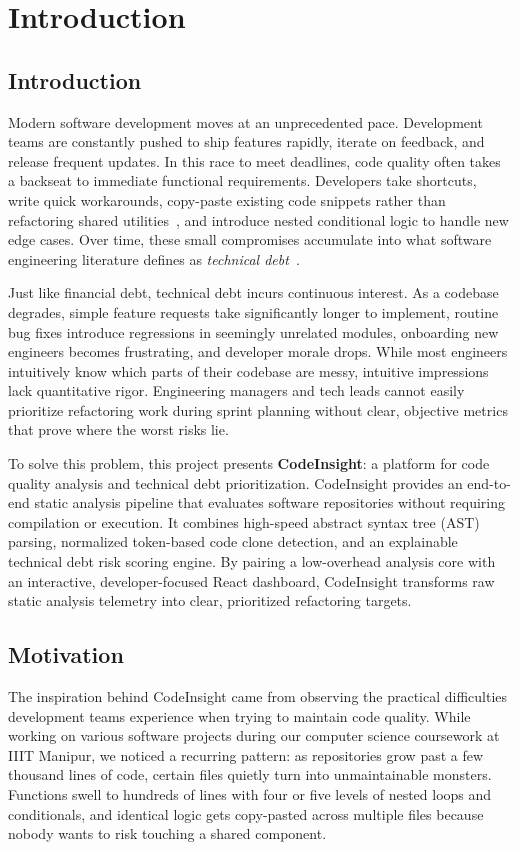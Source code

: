 \chapter{Introduction}

\section{Introduction}
Modern software development moves at an unprecedented pace. Development teams are constantly pushed to ship features rapidly, iterate on feedback, and release frequent updates. In this race to meet deadlines, code quality often takes a backseat to immediate functional requirements. Developers take shortcuts, write quick workarounds, copy-paste existing code snippets rather than refactoring shared utilities~\cite{fowler1999}, and introduce nested conditional logic to handle new edge cases. Over time, these small compromises accumulate into what software engineering literature defines as \textit{technical debt}~\cite{cunningham1992,avgeriou2016}.

Just like financial debt, technical debt incurs continuous interest. As a codebase degrades, simple feature requests take significantly longer to implement, routine bug fixes introduce regressions in seemingly unrelated modules, onboarding new engineers becomes frustrating, and developer morale drops. While most engineers intuitively know which parts of their codebase are messy, intuitive impressions lack quantitative rigor. Engineering managers and tech leads cannot easily prioritize refactoring work during sprint planning without clear, objective metrics that prove where the worst risks lie.

To solve this problem, this project presents \textbf{CodeInsight}: a platform for code quality analysis and technical debt prioritization. CodeInsight provides an end-to-end static analysis pipeline that evaluates software repositories without requiring compilation or execution. It combines high-speed abstract syntax tree (AST) parsing, normalized token-based code clone detection, and an explainable technical debt risk scoring engine. By pairing a low-overhead analysis core with an interactive, developer-focused React dashboard, CodeInsight transforms raw static analysis telemetry into clear, prioritized refactoring targets.

\section{Motivation}
The inspiration behind CodeInsight came from observing the practical difficulties development teams experience when trying to maintain code quality. While working on various software projects during our computer science coursework at IIIT Manipur, we noticed a recurring pattern: as repositories grow past a few thousand lines of code, certain files quietly turn into unmaintainable monsters. Functions swell to hundreds of lines with four or five levels of nested loops and conditionals, and identical logic gets copy-pasted across multiple files because nobody wants to risk touching a shared component.

